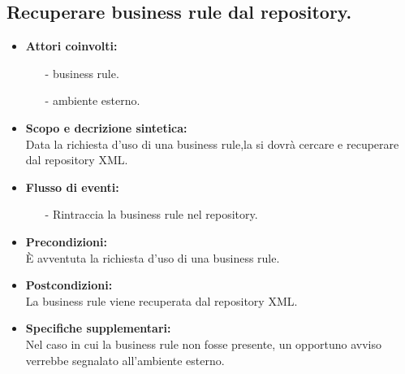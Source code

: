 \documentclass[11pt,titlepage,a4paper]{report}
\begin{document}
\subsection{Recuperare business rule dal repository.}
\begin{itemize}
\item{\textbf{Attori coinvolti:}}
\begin{itemize}
\item[-] business rule.
\item[-] ambiente esterno.
\end{itemize}
\item{\textbf{Scopo e decrizione sintetica:}}\\
Data la richiesta d'uso di una business rule,la si dovr\`a cercare e recuperare dal repository XML.
\item{\textbf{Flusso di eventi:}}
\begin{itemize}
 \item[-] Rintraccia la business rule nel repository.
\end{itemize}
\item{\textbf{Precondizioni:}}\\
\`E avventuta la richiesta d'uso di una business rule.
\item{\textbf{Postcondizioni:}}\\
La business rule viene recuperata dal repository XML.
\item\textbf{{Specifiche supplementari:}}\\
Nel caso in cui la business rule non fosse presente, un opportuno avviso verrebbe segnalato all'ambiente esterno.
\end{itemize}
\end{document}
